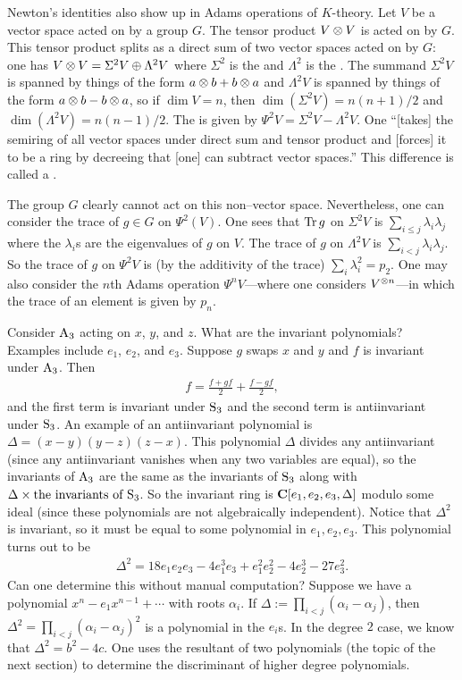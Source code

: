 \documentclass[11pt, oneside,margin=1in]{article}
\begin{document}
Newton's identities also show up in Adams operations of $K$-theory. Let $V$ be a vector space acted on by a group $G$. The tensor product $V\otimes V$ is acted on by $G$. This tensor product splits as a direct sum of two vector spaces acted on by $G$: one has $V\otimes V = \Sigma^2 V \oplus \Lambda^2 V$ where $\Sigma^2$ is the  and $\Lambda ^2$ is the . The summand $\Sigma^2 V$ is spanned by things of the form $a\otimes b + b\otimes a$ and $\Lambda^2 V$ is spanned by things of the form $a\otimes b - b\otimes a$, so if $\dim V = n$, then $\dim (\Sigma ^2 V) = n (n+1)/2$ and $\dim(\Lambda^2V) = n (n-1)/2$. The  is given by $\Psi^2V = \Sigma^2 V - \Lambda^2 V$. One ``[takes] the semiring of all vector spaces under direct sum and tensor product and [forces] it to be a ring by decreeing that [one] can subtract vector spaces.'' This difference is called a . 

The group $G$ clearly cannot act on this non--vector space. Nevertheless, one can consider the trace of $g\in G$ on $\Psi^2 (V)$. One sees that $\operatorname{Tr} g$ on $\Sigma^2 V$ is $\sum_{i\le j} \lambda_i\lambda_j$ where the $\lambda_i$s are the eigenvalues of $g$ on $V$. The trace of $g$ on $\Lambda^2 V$ is $\sum_{i<j} \lambda_i\lambda_j$. So the trace of $g$ on $\Psi^2 V$ is (by the additivity of the trace) $\sum_{i} \lambda_i^2=p_2$. One may also consider the $n$th Adams operation $\Psi^nV$---where one considers $V^{\otimes n}$---in which the trace of an element is given by $p_n$.

Consider $\operatorname{A}_3$ acting on $x$, $y$, and $z$. What are the invariant polynomials? Examples include $e_1$, $e_2$, and $e_3$. Suppose $g$ swaps $x$ and $y$ and $f$ is invariant under $\operatorname{A}_3$. Then 
\begin{align*}
	f = \frac{f + gf}{2} + \frac{f-gf}{2},
\end{align*}
and the first term is invariant under $\operatorname{S}_3$ and the second term is antiinvariant under $\operatorname{S}_3$. An example of an antiinvariant polynomial is $\Delta = (x-y) (y-z) (z-x)$. This polynomial $\Delta $ divides any antiinvariant (since any antiinvariant vanishes when any two variables are equal), so the invariants of $\operatorname{A}_3$ are the same as the invariants of $\operatorname{S}_3$ along with $\Delta \times\textrm{the invariants of $\operatorname{S}_3$}$. So the invariant ring is $\mathbf C[e_1,e_2,e_3,\Delta]$ modulo some ideal (since these polynomials are not algebraically independent). Notice that $\Delta^2 $ is invariant, so it must be equal to some polynomial in $e_1, e_2, e_3$. This polynomial turns out to be 
\begin{align*}
	\Delta^2 = 18e_1e_2e_3 - 4e_1^3e_3 + e_1^2 e_2^2 - 4e_2 ^3 - 27 e_3^2.
\end{align*}
Can one determine this without manual computation? Suppose we have a polynomial $x^n - e_1x^{n-1} +\cdots$ with roots $\alpha_i$. If $\Delta := \prod_{i<j} (\alpha_i - \alpha_j)$, then $\Delta^2 = \prod_{i<j} (\alpha_i-\alpha_j)^2$ is a polynomial in the $e_i$s. In the degree $2$ case, we know that $\Delta^2 = b^2 - 4c$. One uses the resultant of two polynomials (the topic of the next section) to determine the discriminant of higher degree polynomials.
\end{document}
